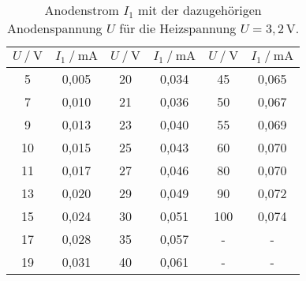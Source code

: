 %

\begin{table}[H]
    \centering
    \caption{Anodenstrom $I_1$ mit der dazugehörigen Anodenspannung $U$ für die Heizspannung $U = 3,2 \, \unit{\volt} $.}
    \label{tab:kennlini1_1}
    \begin{tabular}{S S S S S[table-format=3.0] S}
      \toprule
      {$U \mathbin{/} \unit{\volt}$} & {$I_1 \mathbin{/} \unit{\milli\ampere}$} & {$U \mathbin{/} \unit{\volt}$} & {$I_1 \mathbin{/} \unit{\milli\ampere}$} & {$U \mathbin{/} \unit{\volt}$} & {$I_1 \mathbin{/} \unit{\milli\ampere}$}  \\
      \midrule
        {5}&       {0,005} & {20}&      {0,034} & {45}&      {0,065}\\
        {7}&       {0,010} & {21}&      {0,036} & {50}&      {0,067}\\
        {9}&       {0,013} & {23}&      {0,040} & {55}&      {0,069}\\
        {10}&      {0,015} & {25}&      {0,043} & {60}&      {0,070}\\
        {11}&      {0,017} & {27}&      {0,046} & {80}&      {0,070}\\
        {13}&      {0,020} & {29}&      {0,049} & {90}&      {0,072}\\
        {15}&      {0,024} & {30}&      {0,051} & {100}&     {0,074}\\
        {17}&      {0,028} & {35}&      {0,057} & {-}   &    {-}    \\
        {19}&      {0,031} & {40}&      {0,061} & {-}   &    {-}    \\
      \bottomrule
    \end{tabular}
\end{table}


